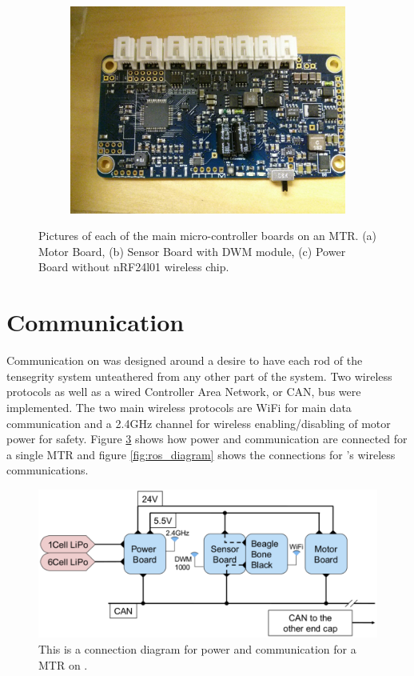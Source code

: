 \begin{figure}[thpb]
\begin{subfigure}{.29\linewidth}
      \includegraphics[width=\columnwidth]{tex/img/power_board}
      \caption{}
      \label{fig:power_board}
\end{subfigure}
\caption{Pictures of each of the main micro-controller boards on an MTR. (a) Motor Board, (b) Sensor Board with DWM module, (c) Power Board without nRF24l01 wireless chip.}
\label{fig:MTR_uC_boards}
\end{figure}

\section{Communication}
\label{communication}

Communication on \SB{} was designed around a desire to have each rod of the tensegrity system unteathered from any other part of the system.
Two wireless protocols as well as a wired Controller Area Network, or CAN, bus were implemented.
The two main wireless protocols are WiFi for main data communication and a 2.4GHz channel for wireless enabling/disabling of motor power for safety.
Figure \ref{fig:connection_diagram} shows how power and communication are connected for a single MTR and figure \ref{fig:ros_diagram} shows the connections for \SB{}'s wireless communications.

\begin{figure}[thpb]%
      \centering
      \includegraphics[width=0.8\columnwidth]{tex/img/hard_wire_connection}
      \caption{This is a connection diagram for power and communication for a MTR on \SB{}.}
      \label{fig:connection_diagram}
\end{figure}

